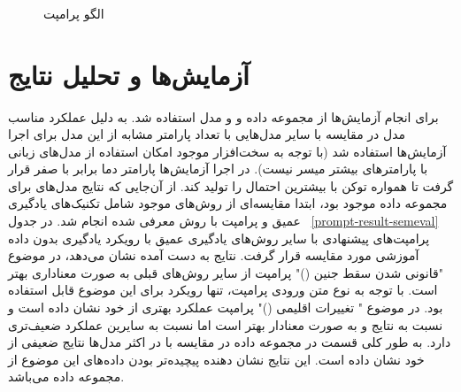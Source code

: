 \begin{figure}[H]
\begin{boxK}
		\\
		\\
		\\
	\end{boxK}
	\caption{\label{fewshot-Cot-Context Description-prompt}الگو پرامپت }
\end{figure}

\section{آزمایش‌ها و تحلیل نتایج}
برای انجام آزمایش‌ها از مجموعه داده
\cite{shiwakoti2024analyzing}
و
\cite{mohammad-etal-2016-semeval}
و مدل
\cite{orca-mini-v3-7b}
استفاده شد. به دلیل عملکرد مناسب مدل 
در مقایسه با سایر مدل‌هایی با تعداد پارامتر مشابه از این مدل برای اجرا آزمایش‌ها استفاده شد (با توجه به سخت‌افزار موجود امکان استفاده از مدل‌های زبانی با پارامترهای بیشتر میسر نیست). در اجرا آزمایش‌ها پارامتر دما
برابر با صفر قرار گرفت تا همواره توکن با بیشترین احتمال را تولید کند. از آن‌جایی که نتایج مدل‌های
برای مجموعه داده 
موجود بود، ابتدا مقایسه‌ای از روش‌های موجود شامل تکنیک‌های یادگیری عمیق و پرامپت با روش معرفی شده انجام شد. در جدول
~\ref{prompt-result-semeval}
پرامپت‌های پیشنهادی با سایر روش‌های یادگیری عمیق با رویکرد یادگیری بدون داده آموزشی مورد مقایسه قرار گرفت. نتایج به دست آمده نشان می‌دهد، در موضوع "قانونی شدن سقط جنین ()" پرامپت
از سایر روش‌های قبلی به صورت معناداری بهتر است. با توجه به نوع متن ورودی پرامپت، تنها رویکرد
برای این موضوع قابل استفاده بود. در موضوع " تغییرات اقلیمی ()" پرامپت 
عملکرد بهتری از خود نشان داده است و نسبت به نتایج
و 
به صورت معنادار بهتر است اما نسبت به سایرین عملکرد ضعیف‌تری دارد. به طور کلی قسمت
در مجموعه داده
در مقایسه با 
در اکثر مدل‌ها نتایج ضعیفی از خود نشان داده است. این نتایج نشان دهنده پیچیده‌تر بودن داده‌های این موضوع از مجموعه داده
می‌باشد.

